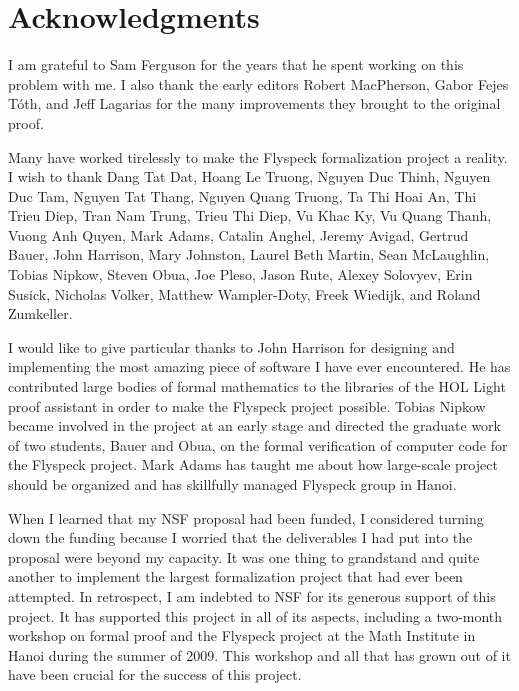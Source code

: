 

\section*{Acknowledgments}


I am grateful to Sam Ferguson for the years that he spent working on
this problem with me.  I also thank the early editors Robert
MacPherson, Gabor Fejes T\'oth, and Jeff Lagarias for the many
improvements they brought to the original proof.

Many have worked tirelessly to make the Flyspeck formalization project
a reality.  I wish to thank 
Dang Tat Dat, 
Hoang Le Truong,
Nguyen Duc Thinh,  
Nguyen Duc Tam, 
Nguyen Tat Thang,
Nguyen Quang Truong, 
Ta Thi Hoai An, 
Thi Trieu Diep,
Tran Nam Trung, 
Trieu Thi Diep, 
Vu Khac Ky, 
Vu Quang Thanh,
Vuong Anh Quyen,
% 
Mark Adams,
Catalin Anghel, 
Jeremy Avigad, 
Gertrud Bauer, 
%
John Harrison, 
Mary Johnston, 
Laurel Beth Martin, 
Sean McLaughlin, 
Tobias Nipkow, 
Steven Obua, 
Joe Pleso, 
%
Jason Rute,
Alexey Solovyev,
Erin Susick,
Nicholas Volker, 
Matthew Wampler-Doty, 
 Freek Wiedijk, 
and Roland Zumkeller.

I would like to give particular thanks 
to John Harrison for designing and implementing the
most amazing piece of software I have ever encountered.  He has
contributed large bodies of formal mathematics to the libraries of the
HOL Light proof assistant in order to make the Flyspeck project
possible.  Tobias Nipkow became involved in the project at an early
stage and directed the graduate work of two students, Bauer and Obua,
on the formal verification of computer code for the Flyspeck
project. Mark Adams has taught me about how large-scale project should
be organized and has skillfully managed Flyspeck group in Hanoi.

When I learned that my NSF proposal had been funded, I considered
turning down the funding because I worried that the deliverables I had
put into the proposal were beyond my capacity.  It was one thing to
grandstand and quite another to implement the largest formalization
project that had ever been attempted.  In retrospect, I am indebted to
NSF for its generous support of this project.  It has supported this
project in all of its aspects, including a two-month workshop on
formal proof and the Flyspeck project at the Math Institute in Hanoi
during the summer of 2009.  This workshop and all that has grown out
of it have been crucial for the success of this project.

